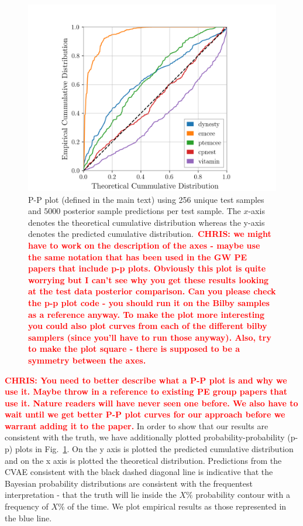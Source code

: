 \documentclass[%
showpacs,
 amsmath,amssymb,
 aps,
 twocolumn,
 prl,
 reprint,
floatfix,
]{revtex4-1}
\newcommand{\chris}[1]{\textbf{\textcolor{red}{CHRIS: #1}}}
\begin{document}
%
%
\begin{figure}
    \includegraphics[width=\columnwidth]{images/latest_pp_plot.png}
    \caption{\label{fig:pp_plot} P-P plot (defined in the main text) using 256
unique test samples and $5000$ posterior sample predictions per test sample.
The $x$-axis denotes the theoretical cumulative distribution whereas the y-axis
denotes the predicted cumulative distribution.~\chris{we might have to work on
the description of the axes - maybe use the same notation that has been used in
the GW PE papers that include p-p plots. Obviously this plot is quite worrying
but I can't see why you get these results looking at the test data posterior
comparison. Can you please check the p-p plot code - you should run it on the
Bilby samples as a reference anyway. To make the plot more interesting you
could also plot curves from each of the different bilby samplers (since you'll
have to run those anyway). Also, try to make the plot square - there is
supposed to be a symmetry between the axes.}}
\end{figure}
%

%
%
\chris{You need to better describe what a P-P plot is and why we use it. Maybe
throw in a reference to existing PE group papers that use it. Nature readers
will have never seen one before. We also have to wait until we get better P-P
plot curves for our approach before we warrant adding it to the paper.} In
order to show that our results are consistent with the truth, we have
additionally plotted probability-probability (p-p) plots in
Fig.~\ref{fig:pp_plot}. On the y axis is plotted the predicted cumulative
distribution and on the x axis is plotted the theoretical distribution.
Predictions from the \ac{CVAE} consistent with the black dashed diagonal line
is indicative that the Bayesian probability distributions are consistent with
the frequentest interpretation - that the truth will lie inside the $X\%$
probability contour with a frequency of $X\%$ of the time.  We plot empirical
results as those represented in the blue line. 
\end{document}
